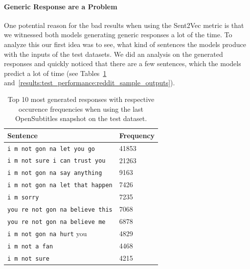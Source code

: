 \paragraph{Generic Response are a Problem} One potential reason for the bad results when using the Sent2Vec metric is that we witnessed both models generating generic responses a lot of the time. To analyze this our first idea was to see, what kind of sentences the models produce with the inputs of the test datasets. We did an analysis on the generated responses and quickly noticed that there are a few sentences, which the models predict a lot of time (see Tables~\ref{results:test_performance:opensubtitles_sample_outputs} and~\ref{results:test_performance:reddit_sample_outputs}).
\\
\begin{table}[H]
	\centering
	\begin{adjustbox}{max width=\textwidth}
		\begin{tabular}{ll}
			\toprule
			Sentence & Frequency\\ \midrule
			\texttt{i m not gon na let you go} & 41853\\
			\texttt{i m not sure i can trust you} & 21263\\
			\texttt{i m not gon na say anything} & 9163\\
			\texttt{i m not gon na let that happen} & 7426\\
			\texttt{i m sorry} & 7235\\
			\texttt{you re not gon na believe this} & 7068\\
			\texttt{you re not gon na believe me} & 6878\\
			\texttt{i m not gon na hurt} you & 4829\\
			\texttt{i m not a fan} & 4468\\
			\texttt{i m not sure} & 4215\\
			\bottomrule
		\end{tabular}
	\end{adjustbox}
	\caption{Top 10 most generated responses with respective occurence frequencies when using the last OpenSubtitles snapshot on the test dataset.}
	\label{results:test_performance:opensubtitles_sample_outputs}
\end{table}

